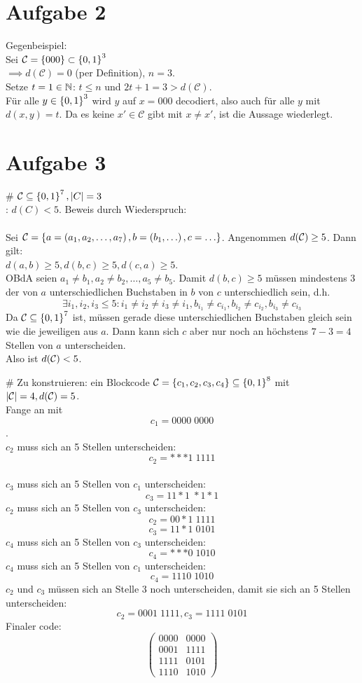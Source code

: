 

\section*{Aufgabe 2}
Gegenbeispiel:\\
Sei $\mathcal C = \left\lbrace 000 \right\rbrace\subset\left\lbrace 0, 1 \right\rbrace^3$\\
$\implies d(\mathcal C)=0$ (per Definition), $n=3$.\\
Setze $t=1\in\mathbb{N}$: $t\leq n$ und $2t+1=3>d(\mathcal C)$.\\
Für alle $y\in \left\lbrace 0, 1 \right\rbrace^3$ wird $y$ auf $x=000$ decodiert, also auch für alle $y$ mit $d(x, y)=t$. Da es keine $x'\in\mathcal C$ gibt mit $x\not= x'$, ist die Aussage wiederlegt.

\section*{Aufgabe 3}
\begin{myList}
# $\mathcal{C} \subseteq\left\lbrace 0,1 \right\rbrace^7, |C|=3$\\
\ZZ: $d(C)< 5$. Beweis durch Wiederspruch:\\\\
Sei $\mathcal{C}=\left\lbrace a=\left( a_1, a_2,\ldots, a_7 \right), b=\left( b_1, \ldots \right), c=\ldots \right\rbrace$. Angenommen $d(\mathcal{C})\geq 5$. Dann gilt:\\
$d(a, b)\geq 5, d(b, c)\geq 5, d(c, a)\geq 5$.\\
OBdA seien $a_1\not=b_1, a_2\not=b_2, \ldots, a_5\not= b_5$. Damit $d(b, c)\geq 5$ müssen mindestens 3 der von $a$ unterschiedlichen Buchstaben in $b$ von $c$ unterschiedlich sein, d.h.
$$\exists i_1, i_2, i_3 \leq 5: i_1\not=i_2\not=i_3\not=i_1, b_{i_1}\not= c_{i_1},   b_{i_2}\not= c_{i_2},   b_{i_3}\not= c_{i_3} $$
Da $\mathcal{C}\subseteq\left\lbrace 0, 1 \right\rbrace^7$ ist, müssen gerade diese unterschiedlichen Buchstaben gleich sein wie die jeweiligen aus $a$. Dann kann sich $c$ aber nur noch an höchstens $7-3=4$ Stellen von $a$ unterscheiden. \\
Also ist $d(\mathcal{C})< 5$.

# Zu konstruieren: ein Blockcode $\mathcal{C}=\left\lbrace c_1, c_2, c_3, c_4 \right\rbrace\subseteq\left\lbrace 0,1 \right\rbrace^8$ mit $|\mathcal{C}|=4, d(\mathcal{C})=5$.   \\
Fange an mit $$c_1=0000\;0000$$.\\
$c_2$ muss sich an 5 Stellen unterscheiden: $$c_2= ***1\;1111$$\\
$c_3$ muss sich an 5 Stellen von $c_1$ unterscheiden: $$c_3=11*1\;*1*1$$
$c_2$ muss sich an 5 Stellen von $c_3$ unterscheiden: $$c_2=00*1\;1111$$
$$c_3=11*1\;0101$$
$c_4$ muss sich an 5 Stellen von $c_3$ unterscheiden:
$$c_4=***0\;1010$$
$c_4$ muss sich an 5 Stellen von $c_1$ unterscheiden:
$$c_4=1110\;1010$$
$c_2$ und $c_3$ müssen sich an Stelle 3 noch unterscheiden, damit sie sich an 5 Stellen unterscheiden:
$$c_2=0001\;1111, c_3=1111\;0101$$
Finaler code:
$$\begin{pmatrix}
0000&0000\\
0001&1111\\
1111&0101\\
1110&1010
\end{pmatrix}$$
\end{myList}






